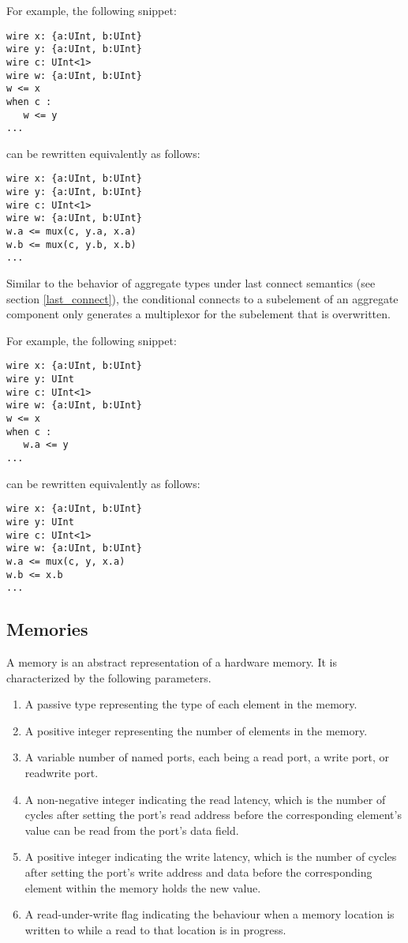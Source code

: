 \documentclass[12pt]{article}
\begin{document}
For example, the following snippet:
\begin{lstlisting}
wire x: {a:UInt, b:UInt}
wire y: {a:UInt, b:UInt}
wire c: UInt<1>
wire w: {a:UInt, b:UInt}
w <= x
when c :
   w <= y
...   
\end{lstlisting}
can be rewritten equivalently as follows:
\begin{lstlisting}
wire x: {a:UInt, b:UInt}
wire y: {a:UInt, b:UInt}
wire c: UInt<1>
wire w: {a:UInt, b:UInt}
w.a <= mux(c, y.a, x.a)
w.b <= mux(c, y.b, x.b)
...
\end{lstlisting}

Similar to the behavior of aggregate types under last connect semantics (see section \ref{last_connect}), the conditional connects to a subelement of an aggregate component only generates a multiplexor for the subelement that is overwritten.

For example, the following snippet:
\begin{lstlisting}
wire x: {a:UInt, b:UInt}
wire y: UInt
wire c: UInt<1>
wire w: {a:UInt, b:UInt}
w <= x
when c :
   w.a <= y
...   
\end{lstlisting}
can be rewritten equivalently as follows:
\begin{lstlisting}
wire x: {a:UInt, b:UInt}
wire y: UInt
wire c: UInt<1>
wire w: {a:UInt, b:UInt}
w.a <= mux(c, y, x.a)
w.b <= x.b
...
\end{lstlisting}

\subsection{Memories}
A memory is an abstract representation of a hardware memory. It is characterized by the following parameters.
\begin{enumerate}
\item A passive type representing the type of each element in the memory.
\item A positive integer representing the number of elements in the memory.
\item A variable number of named ports, each being a read port, a write port, or readwrite port.
\item A non-negative integer indicating the read latency, which is the number of cycles after setting the port's read address before the corresponding element's value can be read from the port's data field.
\item A positive integer indicating the write latency, which is the number of cycles after setting the port's write address and data before the corresponding element within the memory holds the new value.
\item A read-under-write flag indicating the behaviour when a memory location is written to while a read to that location is in progress.
\end{enumerate}
\end{document}
